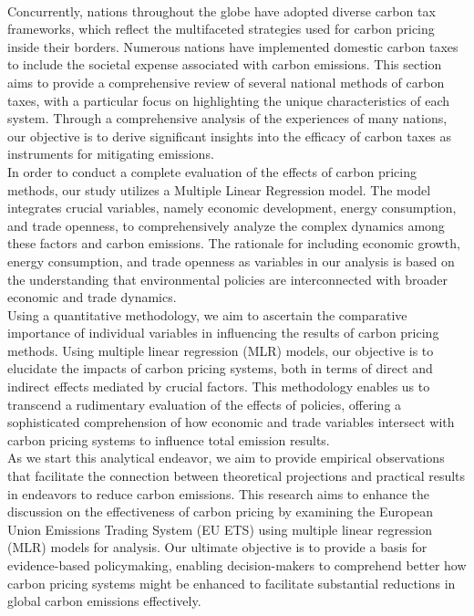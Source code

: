 \documentclass[12pt]{article}
\begin{document}
\\[.5\baselineskip]
Concurrently, nations throughout the globe have adopted diverse carbon tax frameworks, which reflect the multifaceted strategies used for carbon pricing inside their borders. Numerous nations have implemented domestic carbon taxes to include the societal expense associated with carbon emissions. This section aims to provide a comprehensive review of several national methods of carbon taxes, with a particular focus on highlighting the unique characteristics of each system. Through a comprehensive analysis of the experiences of many nations, our objective is to derive significant insights into the efficacy of carbon taxes as instruments for mitigating emissions.
\\[\baselineskip]
In order to conduct a complete evaluation of the effects of carbon pricing methods, our study utilizes a Multiple Linear Regression model. The model integrates crucial variables, namely economic development, energy consumption, and trade openness, to comprehensively analyze the complex dynamics among these factors and carbon emissions. The rationale for including economic growth, energy consumption, and trade openness as variables in our analysis is based on the understanding that environmental policies are interconnected with broader economic and trade dynamics. 
\\[.5\baselineskip]
Using a quantitative methodology, we aim to ascertain the comparative importance of individual variables in influencing the results of carbon pricing methods. Using multiple linear regression (MLR) models, our objective is to elucidate the impacts of carbon pricing systems, both in terms of direct and indirect effects mediated by crucial factors. This methodology enables us to transcend a rudimentary evaluation of the effects of policies, offering a sophisticated comprehension of how economic and trade variables intersect with carbon pricing systems to influence total emission results.
\\[\baselineskip]
As we start this analytical endeavor, we aim to provide empirical observations that facilitate the connection between theoretical projections and practical results in endeavors to reduce carbon emissions. This research aims to enhance the discussion on the effectiveness of carbon pricing by examining the European Union Emissions Trading System (EU ETS) using multiple linear regression (MLR) models for analysis. Our ultimate objective is to provide a basis for evidence-based policymaking, enabling decision-makers to comprehend better how carbon pricing systems might be enhanced to facilitate substantial reductions in global carbon emissions effectively.
\end{document}
